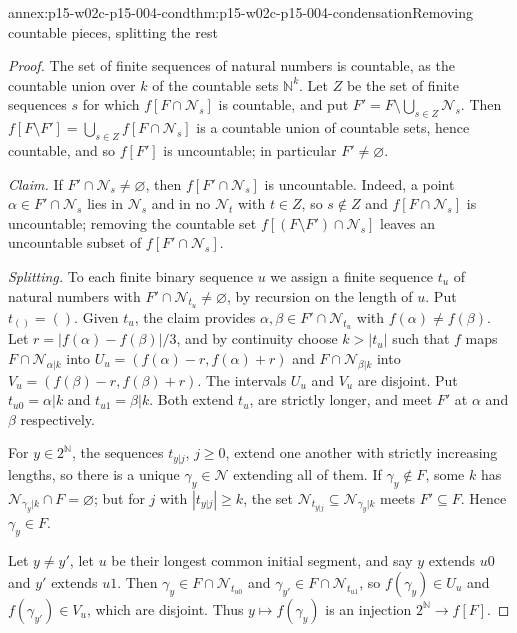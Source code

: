 \begin{annexitem}{annex:p15-w02c-p15-004-cond}{thm:p15-w02c-p15-004-condensation}{Removing countable pieces, splitting the rest}
\begin{proof}
The set of finite sequences of natural numbers is countable, as the
countable union over \(k\) of the countable sets \(\mathbb N^k\). Let
\(Z\) be the set of finite sequences \(s\) for which
\(f[F\cap\mathcal N_s]\) is countable, and put
\(F'=F\setminus\bigcup_{s\in Z}\mathcal N_s\). Then
\(f[F\setminus F']=\bigcup_{s\in Z}f[F\cap\mathcal N_s]\) is a countable
union of countable sets, hence countable, and so \(f[F']\) is
uncountable; in particular \(F'\neq\varnothing\).

\emph{Claim.} If \(F'\cap\mathcal N_s\neq\varnothing\), then
\(f[F'\cap\mathcal N_s]\) is uncountable. Indeed, a point
\(\alpha\in F'\cap\mathcal N_s\) lies in \(\mathcal N_s\) and in no
\(\mathcal N_t\) with \(t\in Z\), so \(s\notin Z\) and
\(f[F\cap\mathcal N_s]\) is uncountable; removing the countable set
\(f[(F\setminus F')\cap\mathcal N_s]\) leaves an uncountable subset of
\(f[F'\cap\mathcal N_s]\).

\emph{Splitting.} To each finite binary sequence \(u\) we assign a finite
sequence \(t_u\) of natural numbers with
\(F'\cap\mathcal N_{t_u}\neq\varnothing\), by recursion on the length of
\(u\). Put \(t_{()}=()\). Given \(t_u\), the claim provides
\(\alpha,\beta\in F'\cap\mathcal N_{t_u}\) with \(f(\alpha)\neq f(\beta)\).
Let \(r=|f(\alpha)-f(\beta)|/3\), and by continuity choose \(k>|t_u|\)
such that \(f\) maps \(F\cap\mathcal N_{\alpha|k}\) into
\(U_u=(f(\alpha)-r,f(\alpha)+r)\) and \(F\cap\mathcal N_{\beta|k}\) into
\(V_u=(f(\beta)-r,f(\beta)+r)\). The intervals \(U_u\) and \(V_u\) are
disjoint. Put \(t_{u0}=\alpha|k\) and \(t_{u1}=\beta|k\). Both extend
\(t_u\), are strictly longer, and meet \(F'\) at \(\alpha\) and \(\beta\)
respectively.

For \(y\in2^{\mathbb N}\), the sequences \(t_{y|j}\), \(j\geq0\), extend
one another with strictly increasing lengths, so there is a unique
\(\gamma_y\in\mathcal N\) extending all of them. If \(\gamma_y\notin F\),
some \(k\) has \(\mathcal N_{\gamma_y|k}\cap F=\varnothing\); but for
\(j\) with \(|t_{y|j}|\geq k\), the set
\(\mathcal N_{t_{y|j}}\subseteq\mathcal N_{\gamma_y|k}\) meets
\(F'\subseteq F\). Hence \(\gamma_y\in F\).

Let \(y\neq y'\), let \(u\) be their longest common initial segment, and
say \(y\) extends \(u0\) and \(y'\) extends \(u1\). Then
\(\gamma_y\in F\cap\mathcal N_{t_{u0}}\) and
\(\gamma_{y'}\in F\cap\mathcal N_{t_{u1}}\), so \(f(\gamma_y)\in U_u\)
and \(f(\gamma_{y'})\in V_u\), which are disjoint. Thus
\(y\mapsto f(\gamma_y)\) is an injection \(2^{\mathbb N}\to f[F]\).
\end{proof}
\end{annexitem}

